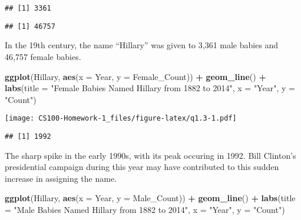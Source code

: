 \documentclass[]{article}
\newenvironment{Shaded}{\begin{snugshade}}{\end{snugshade}}
\newcommand{\DataTypeTok}[1]{\textcolor[rgb]{0.13,0.29,0.53}{#1}}
\newcommand{\KeywordTok}[1]{\textcolor[rgb]{0.13,0.29,0.53}{\textbf{#1}}}
\newcommand{\NormalTok}[1]{#1}
\newcommand{\OperatorTok}[1]{\textcolor[rgb]{0.81,0.36,0.00}{\textbf{#1}}}
\newcommand{\StringTok}[1]{\textcolor[rgb]{0.31,0.60,0.02}{#1}}
\begin{document}
\begin{verbatim}
## [1] 3361
\end{verbatim}

\begin{Shaded}
\end{Shaded}

\begin{verbatim}
## [1] 46757
\end{verbatim}

In the 19th century, the name ``Hillary'' was given to 3,361 male babies
and 46,757 female babies.

\begin{Shaded}
\begin{Highlighting}[]
\KeywordTok{ggplot}\NormalTok{(Hillary, }\KeywordTok{aes}\NormalTok{(}\DataTypeTok{x =}\NormalTok{ Year, }\DataTypeTok{y =}\NormalTok{ Female_Count)) }\OperatorTok{+}\StringTok{ }\KeywordTok{geom_line}\NormalTok{() }\OperatorTok{+}\StringTok{ }
\StringTok{  }\KeywordTok{labs}\NormalTok{(}\DataTypeTok{title =} \StringTok{"Female Babies Named Hillary from 1882 to 2014"}\NormalTok{, }\DataTypeTok{x =} \StringTok{"Year"}\NormalTok{, }\DataTypeTok{y =} \StringTok{"Count"}\NormalTok{)}
\end{Highlighting}
\end{Shaded}

\texttt{[image: CS100-Homework-1\_files/figure-latex/q1.3-1.pdf]}

\begin{Shaded}
\end{Shaded}

\begin{verbatim}
## [1] 1992
\end{verbatim}

The sharp spike in the early 1990s, with its peak occuring in 1992. Bill
Clinton's presidential campaign during this year may have contributed to
this sudden increase in assigning the name.

\begin{Shaded}
\begin{Highlighting}[]
\KeywordTok{ggplot}\NormalTok{(Hillary, }\KeywordTok{aes}\NormalTok{(}\DataTypeTok{x =}\NormalTok{ Year, }\DataTypeTok{y =}\NormalTok{ Male_Count)) }\OperatorTok{+}\StringTok{ }\KeywordTok{geom_line}\NormalTok{() }\OperatorTok{+}\StringTok{ }
\StringTok{  }\KeywordTok{labs}\NormalTok{(}\DataTypeTok{title =} \StringTok{"Male Babies Named Hillary from 1882 to 2014"}\NormalTok{, }\DataTypeTok{x =} \StringTok{"Year"}\NormalTok{, }\DataTypeTok{y =} \StringTok{"Count"}\NormalTok{)}
\end{Highlighting}
\end{Shaded}
\end{document}
